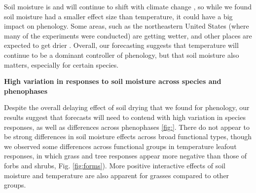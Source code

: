 \documentclass{article}
\begin{document}
\par Soil moisture is and will continue to shift with climate change \citep{berg2017}, so while we found soil moisture had a smaller effect size than temperature, it could have a big impact on phenology. Some areas, such as the northeastern United States (where many of the experiments were conducted) are getting wetter, and other places are expected to get drier \citep{berg2017}. Overall, our forecasting suggests that temperature will continue to be a dominant controller of phenology, but that soil moisture also matters, especially for certain species. 
\par \textbf {High variation in responses to soil moisture across species and phenophases}
\par Despite the overall delaying effect of soil drying that we found for phenology, our results suggest that forecasts will need to contend with high variation in species responses, as well as differences across phenophases \ref{fig:}. There do not appear to be strong differences in soil moisture effects across broad functional types, though we observed some differences across functional groups in temperature leafout responses, in which grass and tree responses appear more negative than those of forbs and shrubs, Fig. \ref{fig:forms}). More positive interactive effects of soil moisture and temperature are also apparent for grasses compared to other groups.  
\end{document}
